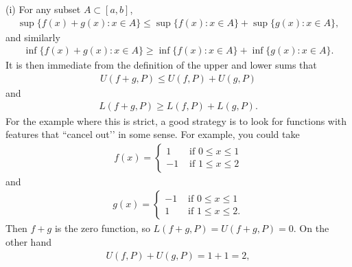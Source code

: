 \documentclass[letterpaper,10pt,english]{jupyterBook}
\begin{document}
\sphinxAtStartPar
(i) For any subset \(A\subset[a,b]\),
\begin{equation*}
\begin{split}
\sup\{f(x)+g(x):x\in A\} \leq \sup\{f(x):x\in A\} + \sup\{g(x):x\in A\},
\end{split}
\end{equation*}
\sphinxAtStartPar
and similarly
\begin{equation*}
\begin{split}
\inf\{f(x)+g(x):x\in A\} \geq \inf\{f(x):x\in A\} + \inf\{g(x):x\in A\}.
\end{split}
\end{equation*}
\sphinxAtStartPar
It is then immediate from the definition of the upper and lower sums that
\begin{equation*}
\begin{split}
U(f+g,P) \leq U(f,P)+U(g,P)
\end{split}
\end{equation*}
\sphinxAtStartPar
and
\begin{equation*}
\begin{split}
L(f+g,P) \geq L(f,P)+L(g,P).
\end{split}
\end{equation*}
\sphinxAtStartPar
For the example where this is strict, a good strategy is to look for functions with features that ``cancel out’’ in some sense. For example, you could take
\begin{equation*}
\begin{split}
f(x) = \left\{\begin{array}{cc} 1 & \text{ if } 0\leq x\leq 1 \\  -1 & \text{ if } 1\leq x\leq 2\end{array}\right.
\end{split}
\end{equation*}
\sphinxAtStartPar
and
\begin{equation*}
\begin{split}
g(x) = \left\{\begin{array}{cc} -1 & \text{ if } 0\leq x\leq 1 \\  1 & \text{ if } 1\leq x\leq 2.\end{array}\right.
\end{split}
\end{equation*}
\sphinxAtStartPar
Then \(f+g\) is the zero function, so \(L(f+g,P)=U(f+g,P)=0\). On the other hand
\begin{equation*}
\begin{split}
U(f,P)+U(g,P) = 1+1 = 2,
\end{split}
\end{equation*}
\end{document}
